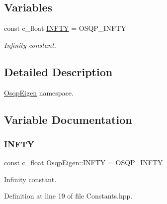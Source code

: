\subsection*{Variables}
\begin{DoxyCompactItemize}
\item 
const c\+\_\+float \mbox{\hyperlink{namespaceOsqpEigen_acfe9d2ea05e99677c0dc9e8f5646098d}{I\+N\+F\+TY}} = O\+S\+Q\+P\+\_\+\+I\+N\+F\+TY
\begin{DoxyCompactList}\small\item\em Infinity constant. \end{DoxyCompactList}\end{DoxyCompactItemize}


\subsection{Detailed Description}
\mbox{\hyperlink{namespaceOsqpEigen}{Osqp\+Eigen}} namespace. 

\subsection{Variable Documentation}
\mbox{\label{namespaceOsqpEigen_acfe9d2ea05e99677c0dc9e8f5646098d}} 
\subsubsection{\texorpdfstring{I\+N\+F\+TY}{INFTY}}
{\footnotesize\ttfamily const c\+\_\+float Osqp\+Eigen\+::\+I\+N\+F\+TY = O\+S\+Q\+P\+\_\+\+I\+N\+F\+TY}



Infinity constant. 



Definition at line 19 of file Constants.\+hpp.

